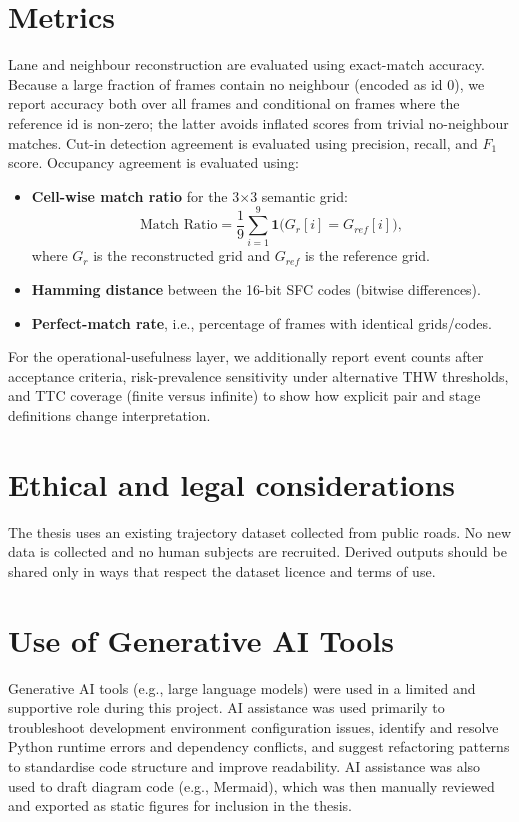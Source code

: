 \documentclass[12pt,a4paper,twoside,openright]{report}
\begin{document}
    \section{Metrics}
    Lane and neighbour reconstruction are evaluated using exact-match accuracy. Because a large fraction of frames contain no neighbour (encoded as id $0$), we report accuracy both over all frames and conditional on frames where the reference id is non-zero; the latter avoids inflated scores from trivial no-neighbour matches. Cut-in detection agreement is evaluated using precision, recall, and $F_1$ score. Occupancy agreement is evaluated using:

    \begin{itemize}[leftmargin=1.2em]
  \item \textbf{Cell-wise match ratio} for the 3$\times$3 semantic grid:
  \[
      \text{Match Ratio}=\frac{1}{9}\sum_{i=1}^{9}\mathbf{1}\big(G_r[i]=G_{ref}[i]\big),
  \]
  where $G_r$ is the reconstructed grid and $G_{ref}$ is the reference grid.
  \item \textbf{Hamming distance} between the 16-bit SFC codes (bitwise differences).
  \item \textbf{Perfect-match rate}, i.e., percentage of frames with identical grids/codes.
    \end{itemize}

    For the operational-usefulness layer, we additionally report event counts after acceptance criteria, risk-prevalence sensitivity under alternative THW thresholds, and TTC coverage (finite versus infinite) to show how explicit pair and stage definitions change interpretation.

    \section{Ethical and legal considerations}
    The thesis uses an existing trajectory dataset collected from public roads. No new data is collected and no human subjects are recruited. Derived outputs should be shared only in ways that respect the dataset licence and terms of use.

    \section{Use of Generative AI Tools}
    Generative AI tools (e.g., large language models) were used in a limited and supportive role during this project. AI assistance was used primarily to troubleshoot development environment configuration issues, identify and resolve Python runtime errors and dependency conflicts, and suggest refactoring patterns to standardise code structure and improve readability. AI assistance was also used to draft diagram code (e.g., Mermaid), which was then manually reviewed and exported as static figures for inclusion in the thesis.
\end{document}
